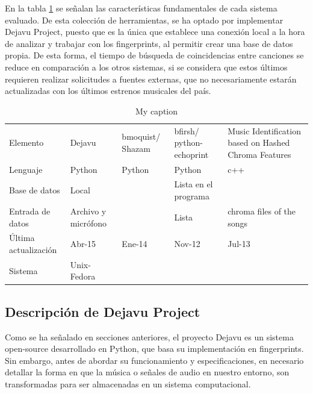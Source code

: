 En la tabla \ref{tab:CuadroComparativoApis} se señalan las características fundamentales de cada sistema evaluado. De esta colección de herramientas, se ha optado por implementar Dejavu Project, puesto que es la única que establece una conexión local a la hora de analizar y trabajar con los fingerprints, al permitir crear una base de datos propia. De esta forma, el tiempo de búsqueda de coincidencias entre canciones se reduce en comparación a los otros sistemas, si se considera que estos últimos requieren realizar solicitudes a fuentes externas, que no necesariamente estarán actualizadas con los últimos estrenos musicales del país.

\FloatBarrier
\begin{table}[h!]
\centering
\caption{My caption}
\label{tab:CuadroComparativoApis}
\begin{tabular}{lllll}
Elemento             & Dejavu              & bmoquist/ Shazam & bfirsh/ python-echoprint & Music Identification based on Hashed Chroma Features \\
Lenguaje             & Python              & Python           & Python                   & c++                                                  \\
Base de datos        & Local               &                  & Lista en el programa     &                                                      \\
Entrada de datos     & Archivo y micrófono &                  & Lista                    & chroma files of the songs                            \\
Última actualización & Abr-15              & Ene-14           & Nov-12                   & Jul-13                                               \\
Sistema              & Unix-Fedora         &                  &                          &                                                     
\end{tabular}
\end{table}



\subsection{Descripción de Dejavu Project} \label{subsec:DescDejavu}


Como se ha señalado en secciones anteriores, el proyecto Dejavu es un sistema open-source desarrollado en Python, que basa su implementación en fingerprints. Sin embargo, antes de abordar su funcionamiento y especificaciones, en necesario detallar la forma en que la música o señales de audio en nuestro entorno, son transformadas para ser almacenadas en un sistema computacional.



